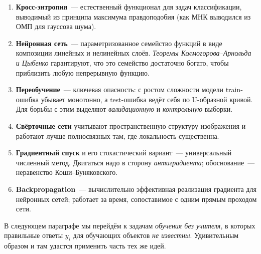 \begin{enumerate}\itemsep1pt
  \item \textbf{Кросс-энтропия}~--- естественный функционал для задач
        классификации, выводимый из принципа максимума правдоподобия
        (как МНК выводился из ОМП для гауссова шума).
  \item \textbf{Нейронная сеть}~--- параметризованное семейство функций
        в виде композиции линейных и нелинейных слоёв.
        \emph{Теоремы Колмогорова--Арнольда и Цыбенко} гарантируют, что
        это семейство достаточно богато, чтобы приблизить любую
        непрерывную функцию.
  \item \textbf{Переобучение}~--- ключевая опасность: с ростом сложности
        модели train-ошибка убывает монотонно, а test-ошибка ведёт
        себя по U-образной кривой. Для борьбы с этим выделяют
        \emph{валидационную} и \emph{контрольную} выборки.
  \item \textbf{Свёрточные сети} учитывают пространственную структуру
        изображения и работают лучше полносвязных там, где локальность
        существенна.
  \item \textbf{Градиентный спуск} и его стохастический вариант~---
        универсальный численный метод. Двигаться надо в сторону
        \emph{антиградиента}; обоснование~--- неравенство
        Коши--Буняковского.
  \item \textbf{Backpropagation}~--- вычислительно эффективная
        реализация градиента для нейронных сетей; работает за время,
        сопоставимое с одним прямым проходом сети.
\end{enumerate}

В следующем параграфе мы перейдём к задачам \emph{обучения без учителя},
в которых правильные ответы $y_i$ для обучающих объектов \emph{не
известны}. Удивительным образом и там удастся применить часть тех же
идей.

